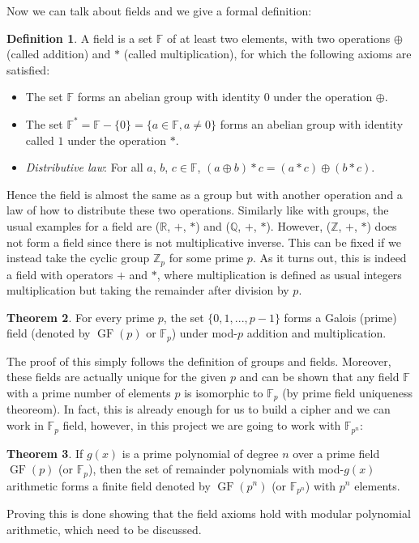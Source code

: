 \documentclass{Resources/UoBLab1}
\theoremstyle{definition}
\newtheorem{theorem}{Theorem}[section]
\newtheorem{definition}[theorem]{Definition}
\begin{document}
Now we can talk about fields and we give a formal definition:
\begin{definition}
    A field is a set $\mathbb{F}$ of at least two elements, with two operations $\oplus$ (called addition) and $*$ (called multiplication), for which the following axioms are satisfied:
    \begin{itemize}
        \item The set $\mathbb{F}$ forms an abelian group with identity $0$ under the operation $\oplus$.
        \item The set $\mathbb{F}^* = \mathbb{F} - \{0\} = \{a \in \mathbb{F}, a \ne 0\}$ forms an abelian group with identity called $1$ under the operation $*$.
        \item \textit{Distributive law}: For all $a$, $b$, $c \in \mathbb{F}$, $(a \oplus b) * c = (a * c) \oplus (b * c)$.
    \end{itemize}
\end{definition}
Hence the field is almost the same as a group but with another operation and a law of how to distribute these two operations. Similarly like with groups, the usual examples for a field are ($\mathbb{R}$, $+$, $*$) and ($\mathbb{Q}$, $+$, $*$). However, ($\mathbb{Z}$, $+$, $*$) does not form a field since there is not multiplicative inverse. This can be fixed if we instead take the cyclic group $\mathbb{Z}_p$ for some prime $p$. As it turns out, this is indeed a field with operators $+$ and $*$, where multiplication is defined as usual integers multiplication but taking the remainder after division by $p$.
\begin{theorem}
    For every prime $p$, the set $\{0, 1, ... , p - 1\}$ forms a Galois (prime) field (denoted by $\operatorname{GF}(p)$ or $\mathbb{F}_p$) under mod-$p$ addition and multiplication.
\end{theorem}
The proof of this simply follows the definition of groups and fields\cite{FieldNotes}. Moreover, these fields are actually unique for the given $p$ and can be shown that any field $\mathbb{F}$ with a prime number of elements $p$ is isomorphic to $\mathbb{F}_p$ (by prime field uniqueness theoreom\cite{FieldNotes}). In fact, this is already enough for us to build a cipher and we can work in $\mathbb{F}_p$ field, however, in this project we are going to work with $\mathbb{F}_{p^n}$:
\begin{theorem}
    If $g(x)$ is a prime polynomial of degree $n$ over a prime field $\operatorname{GF}(p)$ (or $\mathbb{F}_p$), then the set of remainder polynomials with mod-$g(x)$ arithmetic forms a finite field denoted by $\operatorname{GF}(p^n)$ (or $\mathbb{F}_{p^n}$) with $p^n$ elements.
\end{theorem}
Proving this is done showing that the field axioms hold with modular polynomial arithmetic\cite{FieldNotes}, which need to be discussed.
\end{document}
